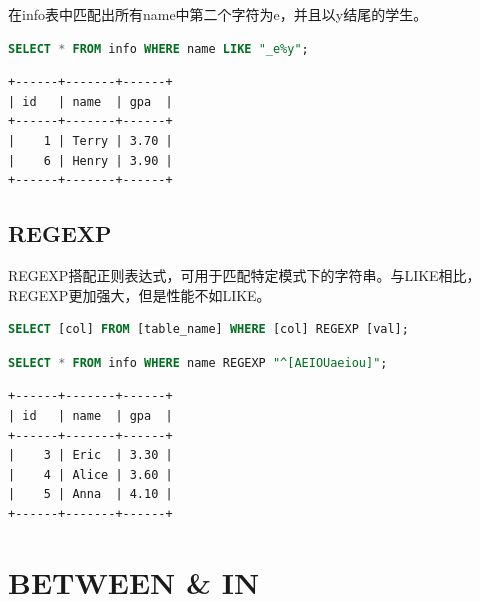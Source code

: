 \documentclass[12pt, openany, oneside]{book}
\begin{document}
在info表中匹配出所有name中第二个字符为e，并且以y结尾的学生。

\vspace{-0.5cm}

\begin{lstlisting}[language=SQL]
SELECT * FROM info WHERE name LIKE "_e%y";
\end{lstlisting}

\begin{tcolorbox}
    \begin{verbatim}
+------+-------+------+
| id   | name  | gpa  |
+------+-------+------+
|    1 | Terry | 3.70 |
|    6 | Henry | 3.90 |
+------+-------+------+
    \end{verbatim}
\end{tcolorbox}

\section{REGEXP}

REGEXP搭配正则表达式，可用于匹配特定模式下的字符串。与LIKE相比，REGEXP更加强大，但是性能不如LIKE。

\vspace{-0.5cm}

\begin{lstlisting}[language=SQL]
SELECT [col] FROM [table_name] WHERE [col] REGEXP [val];
\end{lstlisting}

\vspace{0.5cm}


\begin{lstlisting}[language=SQL]
SELECT * FROM info WHERE name REGEXP "^[AEIOUaeiou]";
\end{lstlisting}

\begin{tcolorbox}
    \begin{verbatim}
+------+-------+------+
| id   | name  | gpa  |
+------+-------+------+
|    3 | Eric  | 3.30 |
|    4 | Alice | 3.60 |
|    5 | Anna  | 4.10 |
+------+-------+------+
    \end{verbatim}
\end{tcolorbox}

\newpage

\chapter{BETWEEN \& IN}
\end{document}
